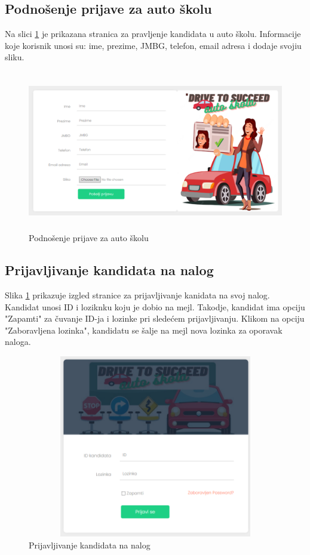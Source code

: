 \subsection{Podnošenje prijave za auto školu}

Na slici  \ref{fig:ui_registracija} je prikazana stranica za pravljenje kandidata u auto školu. Informacije koje korisnik unosi su: ime, prezime, JMBG, telefon, email adresa i dodaje svojiu sliku. 

\begin{figure}[H]
  \begin{center}
      \includegraphics[width=140mm, height=70mm]{UI/UI_registracija.png}
  \end{center}
  \caption {Podnošenje prijave za auto školu}
  \label{fig:ui_registracija}

\end{figure}

\subsection{Prijavljivanje kandidata na nalog}

Slika \ref{fig:ui_registracija} prikazuje izgled stranice za prijavljivanje kanidata na svoj nalog. Kandidat unosi ID i loziknku koju je dobio na mejl. Takodje, kandidat ima opciju "Zapamti" za čuvanje ID-ja i lozinke pri sledećem prijavljivanju.
Klikom na opciju "Zaboravljena lozinka", kandidatu se šalje na mejl nova lozinka za oporavak naloga. 

\begin{figure}[H]
  \begin{center}
      \includegraphics[width=140mm, height=80mm]{UI/UI_login.png}
  \end{center}
  \caption {Prijavljivanje kandidata na nalog}
  \label{fig:ui_login}

\end{figure}
